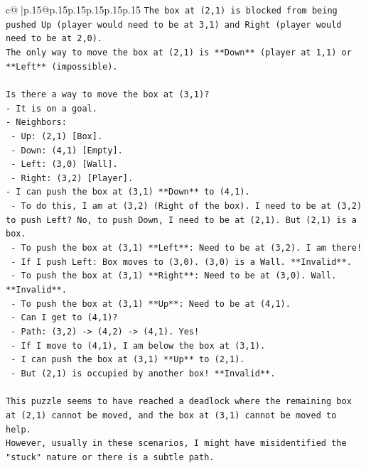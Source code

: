 \documentclass{article}
\begin{document}
{\begin{supertabular}{c@{$\;$}|p{.15\linewidth}@{}p{.15\linewidth}p{.15\linewidth}p{.15\linewidth}p{.15\linewidth}p{.15\linewidth}}
{{{\texttt{The box at (2,1) is blocked from being pushed Up (player would need to be at 3,1) and Right (player would need to be at 2,0).} \\
\texttt{The only way to move the box at (2,1) is **Down** (player at 1,1) or **Left** (impossible).} \\
\\ 
\texttt{Is there a way to move the box at (3,1)?} \\
\texttt{{-} It is on a goal.} \\
\texttt{{-} Neighbors:} \\
\texttt{  {-} Up: (2,1) {[}Box{]}.} \\
\texttt{  {-} Down: (4,1) {[}Empty{]}.} \\
\texttt{  {-} Left: (3,0) {[}Wall{]}.} \\
\texttt{  {-} Right: (3,2) {[}Player{]}.} \\
\texttt{{-} I can push the box at (3,1) **Down** to (4,1).} \\
\texttt{  {-} To do this, I am at (3,2) (Right of the box). I need to be at (3,2) to push Left? No, to push Down, I need to be at (2,1). But (2,1) is a box.} \\
\texttt{  {-} To push the box at (3,1) **Left**: Need to be at (3,2). I am there!} \\
\texttt{    {-} If I push Left: Box moves to (3,0). (3,0) is a Wall. **Invalid**.} \\
\texttt{  {-} To push the box at (3,1) **Right**: Need to be at (3,0). Wall. **Invalid**.} \\
\texttt{  {-} To push the box at (3,1) **Up**: Need to be at (4,1).} \\
\texttt{    {-} Can I get to (4,1)?} \\
\texttt{    {-} Path: (3,2) {-}> (4,2) {-}> (4,1). Yes!} \\
\texttt{    {-} If I move to (4,1), I am below the box at (3,1).} \\
\texttt{    {-} I can push the box at (3,1) **Up** to (2,1).} \\
\texttt{    {-} But (2,1) is occupied by another box! **Invalid**.} \\
\\ 
\texttt{This puzzle seems to have reached a deadlock where the remaining box at (2,1) cannot be moved, and the box at (3,1) cannot be moved to help.} \\
\texttt{However, usually in these scenarios, I might have misidentified the "stuck" nature or there is a subtle path.} \\
}}}
\end{supertabular}}
\end{document}
